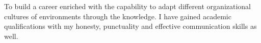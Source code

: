 To build a career enriched with the capability to adapt different organizational cultures of environments through the knowledge. I have gained academic qualifications with my honesty, punctuality and effective communication skills as well.
\vspace{2mm}
\par
